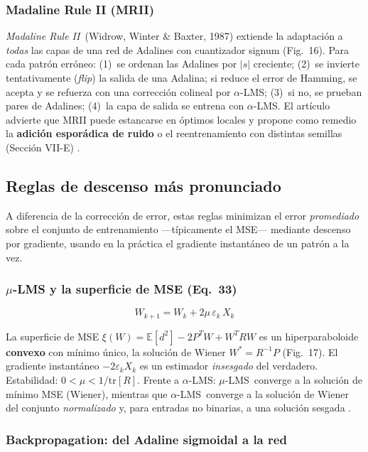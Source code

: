 \documentclass[11pt,a4paper]{article}
\newcommand{\E}{\mathbb{E}}
\newcommand{\aLMS}{$\alpha$-LMS}
\newcommand{\muLMS}{$\mu$-LMS}
\newcommand{\mrii}{\textit{Madaline Rule II}}
\begin{document}
\subsubsection{Madaline Rule II (MRII)}

\mrii~(Widrow, Winter \& Baxter, 1987) \cite{widrow1990} extiende la adaptación a \emph{todas} las
capas de una red de Adalines con cuantizador signum (Fig.~16). Para cada patrón erróneo:
(1)~se ordenan las Adalines por $|s|$ creciente; (2)~se invierte tentativamente (\textit{flip}) la
salida de una Adalina; si reduce el error de Hamming, se acepta y se refuerza con una corrección
colineal por \aLMS; (3)~si no, se prueban pares de Adalines; (4)~la capa de salida se entrena con
\aLMS. El artículo advierte que MRII puede estancarse en óptimos locales y propone como remedio la
\textbf{adición esporádica de ruido} o el reentrenamiento con distintas semillas (Sección VII-E)
\cite{widrow1990}.

\subsection{Reglas de descenso más pronunciado}\label{ssec:sd}

A diferencia de la corrección de error, estas reglas minimizan el error \emph{promediado} sobre el
conjunto de entrenamiento —típicamente el MSE— mediante descenso por gradiente, usando en la
práctica el gradiente instantáneo de un patrón a la vez.

\subsubsection{$\mu$-LMS y la superficie de MSE (Eq.~33)}

\begin{equation}
W_{k+1} = W_k + 2\mu\,\varepsilon_k\,X_k
\label{eq:mu_lms}
\end{equation}

La superficie de MSE $\xi(W) = \E[d^2] - 2P^T W + W^T R W$ es un hiperparaboloide \textbf{convexo}
con mínimo único, la solución de Wiener $W^* = R^{-1}P$ (Fig.~17). El gradiente instantáneo
$-2\varepsilon_k X_k$ es un estimador \emph{insesgado} del verdadero. Estabilidad:
$0 < \mu < 1/\mathrm{tr}[R]$. Frente a \aLMS: \muLMS~converge a la solución de mínimo MSE
(Wiener), mientras que \aLMS~converge a la solución de Wiener del conjunto \emph{normalizado} y,
para entradas no binarias, a una solución sesgada \cite{widrow1990}.

\subsubsection{Backpropagation: del Adaline sigmoidal a la red}
\end{document}
